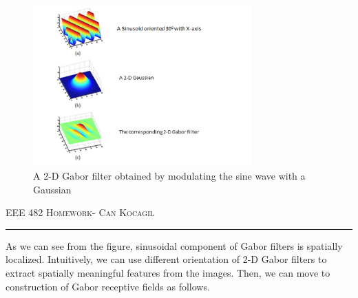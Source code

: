 \documentclass[12pt]{amsart}
\begin{document}
\begin{figure}[ht]
    \centering
    \includegraphics[width = 0.75\textwidth]{images/Gabor.png}
    \caption{A 2-D Gabor filter obtained by modulating the sine wave with a Gaussian}
\end{figure}

\newpage
{\scshape EEE 482} \hfill {\scshape \large  Homework-\relax} \hfill {\scshape Can Kocagil}
\smallskip
\hrule
\vspace{2mm}

As we can see from the figure, sinusoidal component of Gabor filters is spatially localized. Intuitively, we can use different orientation of 2-D Gabor filters to extract spatially meaningful features from the images. Then, we can move to construction of Gabor receptive fields as follows.
\end{document}
